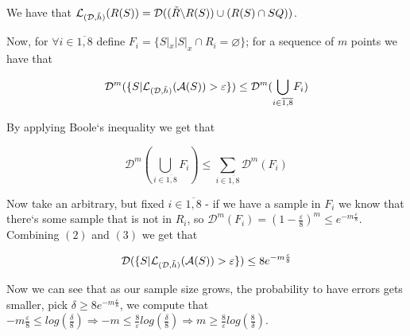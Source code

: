\documentclass{article}
\newcommand{\<}{\langle}
\renewcommand{\>}{\rangle}
\renewcommand{\emptyset}{\varnothing}
\theoremstyle{definition}
\begin{document}
We have that $\mathcal{L}_{(\mathcal{D}, \Tilde{h})}(R(S))=\mathcal{D}((\Tilde{R} \backslash R(S)) \cup (R(S) \cap SQ))$.


Now, for $\forall i \in \overline{1,8}$ define $F_i=\{S|_x | S|_x \cap R_i = \emptyset \}$; for a sequence of $m$ points we have that 

\begin{equation}
    \mathcal{D}^m(\{ S | \mathcal{L}_{(\mathcal{D}, \Tilde{h})}(\mathcal{A}(S)) > \varepsilon \}) \leq \mathcal{D}^m(\underset{i \in \overline{1,8} }{\bigcup}F_i)
\end{equation}

By applying Boole`s inequality we get that

\begin{equation}
    \mathcal{D}^m(\underset{i \in \overline{1,8} }{\bigcup}F_i) \leq \underset{i \in \overline{1,8}}{\sum}\mathcal{D}^m(F_i)
\end{equation}

Now take an arbitrary, but fixed $i \in \overline{1,8}$ - if we have a sample in $F_i$ we know that there`s some sample that is not in $R_i$, so $\mathcal{D}^m(F_i) = (1 - \frac{\varepsilon}{8})^m \leq e^{-m\frac{\varepsilon}{8}}$. Combining $(2)$ and $(3)$ we get that

\begin{equation}
    \mathcal{D}(\{ S | \mathcal{L}_{(\mathcal{D}, \Tilde{h})}(\mathcal{A}(S)) > \varepsilon \}) \leq 
    8e^{-m\frac{\varepsilon}{8}}
\end{equation}

Now we can see that as our sample size grows, the probability to have errors gets smaller, pick $\delta \geq 8e^{-m\frac{\varepsilon}{8}}$, we compute that $-m\frac{\varepsilon}{8}\leq log(\frac{\delta}{8}) \Rightarrow -m \leq \frac{8}{\varepsilon}log(\frac{\delta}{8}) \Rightarrow m \geq \frac{8}{{\varepsilon}}log(\frac{8}{\delta})$.

\vspace{3mm}
\end{document}
